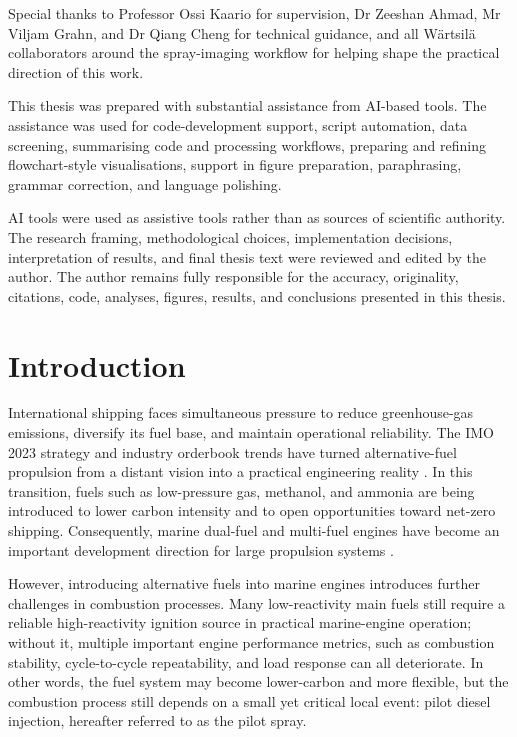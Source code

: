 \documentclass[english, 12pt, a4paper, elec, utf8, a-2b, online]{aaltothesis}
\date{7 April 2026}
\begin{document}
\makecoverpage
\makecopyrightpage

\begin{abstractpage}[english]
\mainabstract

\end{abstractpage}

Special thanks to Professor Ossi Kaario for supervision, Dr Zeeshan Ahmad, Mr Viljam Grahn,
and Dr Qiang Cheng for technical guidance, 
and all Wärtsilä collaborators around the spray-imaging workflow for helping shape the practical direction of this work.

This thesis was prepared with substantial assistance from AI-based tools. The assistance was used for code-development support, script automation, data screening, summarising code and processing workflows, preparing and refining flowchart-style visualisations, support in figure preparation, paraphrasing, grammar correction, and language polishing.

AI tools were used as assistive tools rather than as sources of scientific authority. The research framing, methodological choices, implementation decisions, interpretation of results, and final thesis text were reviewed and edited by the author. The author remains fully responsible for the accuracy, originality, citations, code, analyses, figures, results, and conclusions presented in this thesis.

\thesistableofcontents
\dothesispagenumbering{}

\section{Introduction}

International shipping faces simultaneous pressure to reduce greenhouse-gas emissions, diversify its fuel base, and maintain operational reliability. 
The IMO 2023 strategy and industry orderbook trends have turned alternative-fuel propulsion from a distant vision into a practical engineering reality 
\cite{imo2023ghgstrategy,classnk2025alternativefuels}. 
In this transition, fuels such as low-pressure gas, methanol, and ammonia are being introduced to lower carbon intensity 
and to open opportunities toward net-zero shipping. 
Consequently, marine dual-fuel and multi-fuel engines have become an important development direction for large propulsion systems 
\cite{wingd_lng_faq_2025,wingd_ammonia_faq_2025,classnk_methanol_2024}.

However, introducing alternative fuels into marine engines introduces further challenges in combustion processes.%
Many low-reactivity main fuels still require a reliable high-reactivity ignition source in practical marine-engine operation; 
without it, multiple important engine performance metrics, such as combustion stability, cycle-to-cycle repeatability, and load response can all deteriorate. 
In other words, the fuel system may become lower-carbon and more flexible, 
but the combustion process still depends on a small yet critical local event: pilot diesel injection, 
hereafter referred to as the pilot spray.
\end{document}
